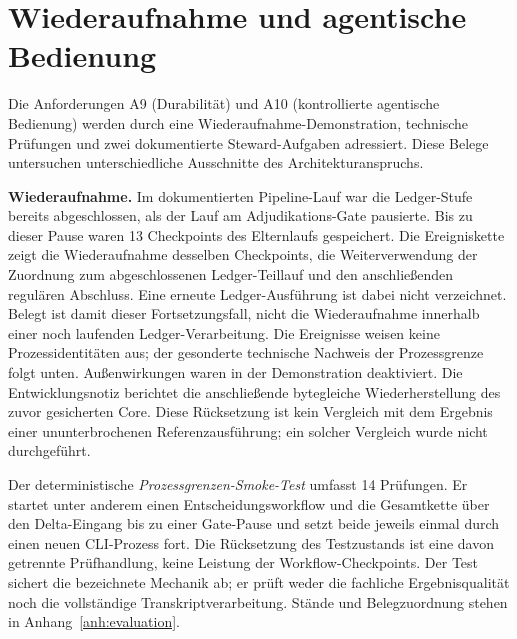 
\section{Wiederaufnahme und agentische Bedienung}
\label{sec:eval-resume}

Die Anforderungen A9 (Durabilität) und A10 (kontrollierte agentische
Bedienung) werden durch eine Wiederaufnahme-Demonstration, technische
Prüfungen und zwei dokumentierte Steward-Aufgaben adressiert. Diese
Belege untersuchen unterschiedliche Ausschnitte des Architekturanspruchs.

\textbf{Wiederaufnahme.} Im dokumentierten Pipeline-Lauf war die
Ledger-Stufe bereits abgeschlossen, als der Lauf am Adjudikations-Gate
pausierte. Bis zu dieser Pause waren 13 Checkpoints des Elternlaufs
gespeichert. Die Ereigniskette zeigt die Wiederaufnahme desselben
Checkpoints, die Weiterverwendung der Zuordnung zum abgeschlossenen
Ledger-Teillauf und den anschließenden regulären Abschluss. Eine erneute
Ledger-Ausführung ist dabei nicht verzeichnet. Belegt ist damit dieser
Fortsetzungsfall, nicht die Wiederaufnahme innerhalb einer noch laufenden
Ledger-Verarbeitung. Die Ereignisse weisen keine Prozessidentitäten aus;
der gesonderte technische Nachweis der Prozessgrenze folgt unten.
Außenwirkungen waren in der Demonstration deaktiviert. Die
Entwicklungsnotiz berichtet die anschließende bytegleiche
Wiederherstellung des zuvor gesicherten Core. Diese Rücksetzung ist
kein Vergleich mit dem Ergebnis einer ununterbrochenen
Referenzausführung; ein solcher Vergleich wurde nicht durchgeführt.

Der deterministische \emph{Prozessgrenzen-Smoke-Test} umfasst
14 Prüfungen. Er startet unter anderem einen Entscheidungsworkflow
und die Gesamtkette über den Delta-Eingang bis zu einer Gate-Pause
und setzt beide jeweils einmal durch einen neuen CLI-Prozess fort.
Die Rücksetzung des Testzustands ist eine davon getrennte
Prüfhandlung, keine Leistung der Workflow-Checkpoints.
Der Test sichert die bezeichnete Mechanik ab; er prüft weder die
fachliche Ergebnisqualität noch die vollständige Transkriptverarbeitung.
Stände und Belegzuordnung stehen in Anhang~\ref{anh:evaluation}.


